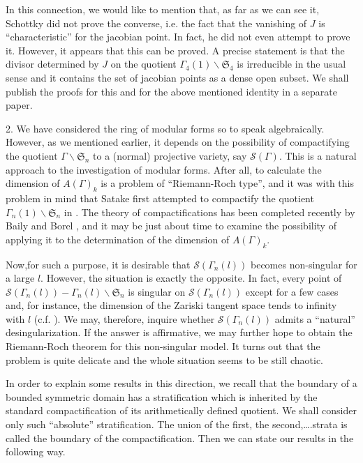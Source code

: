 In this connection, we would like to mention that, as far as we can see it, Schottky did not prove the converse, i.e. the fact that the vanishing of $J$ is ``characteristic'' for the jacobian point. In fact, he did not even attempt to prove it. However, it appears that this can be proved. A precise statement is that the divisor determined by $J$ on the quotient $\Gamma_{4}(1)\backslash \mathfrak{S}_{4}$ is irreducible in the usual sense and it contains the set of jacobian points as a dense open subset. We shall publish the proofs for this and for the above mentioned identity in a separate paper.

2. We have considered the ring of modular forms so to speak algebraically. However, as we mentioned earlier, it depends on the possibility of compactifying the quotient $\Gamma\backslash \mathfrak{S}_{n}$ to a (normal) projective variety, say $\mathscr{S}(\Gamma)$. This is a natural approach to the investigation of modular forms. After all, to calculate the dimension of $A(\Gamma)_{k}$ is a problem of ``Riemann-Roch type'', and it was with this problem in mind that Satake first attempted to compactify the quotient $\Gamma_{n}(1)\backslash\mathfrak{S}_{n}$ in \cite{art12-key18}. The theory of compactifications has been completed recently by Baily and Borel \cite{art12-key2}, and it may be just about time to examine the possibility of applying it to the determination of the dimension of $A(\Gamma)_{k}$.

Now,\pageoriginale for such a purpose, it is desirable that $\mathscr{S}(\Gamma_{n}(l))$ becomes non-singular for a large $l$. However, the situation is exactly the opposite. In fact, every point of $\mathscr{S}(\Gamma_{n}(l))-\Gamma_{n}(l)\backslash \mathfrak{S}_{n}$ is singular on $\mathscr{S}(\Gamma_{n}(l))$ except for a few cases and, for instance, the dimension of the Zariski tangent space tends to infinity with $l$ (c.f. \cite{art12-key10}). We may, therefore, inquire whether $\mathscr{S}(\Gamma_{n}(l))$ admits a ``natural'' desingularization. If the answer is affirmative, we may further hope to obtain the Riemann-Roch theorem for this non-singular model. It turns out that the problem is quite delicate and the whole situation seems to be still chaotic.

In order to explain some results in this direction, we recall that the boundary of a bounded symmetric domain has a stratification which is inherited by the standard compactification of its arithmetically defined quotient. We shall consider only such ``absolute'' stratification. The union of the first, the second,\ldots.strata is called the boundary of the compactification. Then we can state our results in the following way.

